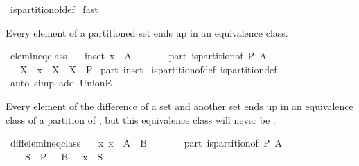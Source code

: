 \begin{isabellebody}
\ is{\isacharunderscore}partition{\isacharunderscore}of{\isacharunderscore}def\isanewline
{}\isamarkupfalse%
\ fast%
\endisatagproof
{\isafoldproof}%
%
\isadelimproof
%
\endisadelimproof
%
\begin{isamarkuptext}%
Every element of a partitioned set ends up in an equivalence class.%
\end{isamarkuptext}%
\isamarkuptrue%
\isamarkupfalse%
\ elem{\isacharunderscore}in{\isacharunderscore}eq{\isacharunderscore}class{\isacharcolon}\isanewline
\ \ \ in{\isacharunderscore}set{\isacharcolon}\ {\isachardoublequoteopen}x\ {\isasymin}\ A{\isachardoublequoteclose}\isanewline
\ \ \ \ \ \ \ part{\isacharcolon}\ {\isachardoublequoteopen}is{\isacharunderscore}partition{\isacharunderscore}of\ P\ A{\isachardoublequoteclose}\isanewline
\ \ \ X\ \ {\isachardoublequoteopen}x\ {\isasymin}\ X{\isachardoublequoteclose}\ \ {\isachardoublequoteopen}X\ {\isasymin}\ P{\isachardoublequoteclose}\isanewline
%
\isadelimproof
%
\endisadelimproof
%
\isatagproof
{}\isamarkupfalse%
\ part\ in{\isacharunderscore}set\isanewline
{}\isamarkupfalse%
\ is{\isacharunderscore}partition{\isacharunderscore}of{\isacharunderscore}def\ is{\isacharunderscore}partition{\isacharunderscore}def\ \isanewline
{}\isamarkupfalse%
\ {\isacharparenleft}auto\ simp\ add{\isacharcolon}\ UnionE{\isacharparenright}%
\endisatagproof
{\isafoldproof}%
%
\isadelimproof
%
\endisadelimproof
%
\begin{isamarkuptext}%
Every element of the difference of a set  and another set  ends up in 
  an equivalence class of a partition of , but this equivalence class will never be
  .%
\end{isamarkuptext}%
\isamarkuptrue%
\isamarkupfalse%
\ diff{\isacharunderscore}elem{\isacharunderscore}in{\isacharunderscore}eq{\isacharunderscore}class{\isacharcolon}\isanewline
\ \ \ x{\isacharcolon}\ {\isachardoublequoteopen}x\ {\isasymin}\ A\ {\isacharminus}\ B{\isachardoublequoteclose}\isanewline
\ \ \ \ \ \ \ part{\isacharcolon}\ {\isachardoublequoteopen}is{\isacharunderscore}partition{\isacharunderscore}of\ P\ A{\isachardoublequoteclose}\isanewline
\ \ \ {\isachardoublequoteopen}{\isasymexists}\ S\ {\isasymin}\ P\ {\isacharminus}\ {\isacharbraceleft}\ B\ {\isacharbraceright}\ {\isachardot}\ x\ {\isasymin}\ S{\isachardoublequoteclose}\isanewline

\end{isabellebody}
